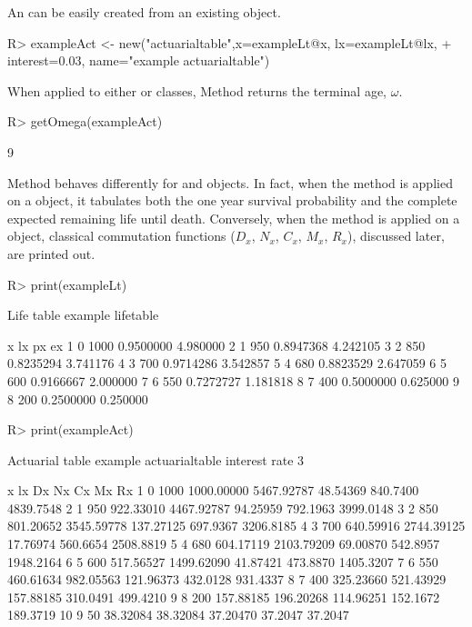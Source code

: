 \documentclass[nojss]{jss}
\begin{document}
An  can be easily created from an existing  object.

\begin{Schunk}
\begin{Sinput}
R> exampleAct <- new("actuarialtable",x=exampleLt@x, lx=exampleLt@lx, 
+  interest=0.03, name="example actuarialtable")
\end{Sinput}
\end{Schunk}

When applied to
either  or  classes, Method   returns the terminal age, $\omega$.

\begin{Schunk}
\begin{Sinput}
R> getOmega(exampleAct)
\end{Sinput}
\begin{Soutput}
[1] 9
\end{Soutput}
\end{Schunk}

Method  behaves differently for  and 
 objects. In fact, when the  method is applied on a
 object, it tabulates both the one year survival probability and the complete
expected remaining life until death. Conversely, when the  method is
applied on a  object, classical commutation
functions ($D_x$, $N_x$, $C_x$, $M_x$, $R_x$), discussed later, are printed out.

\begin{Schunk}
\begin{Sinput}
R> print(exampleLt)
\end{Sinput}
\begin{Soutput}
Life table example lifetable 

  x   lx        px       ex
1 0 1000 0.9500000 4.980000
2 1  950 0.8947368 4.242105
3 2  850 0.8235294 3.741176
4 3  700 0.9714286 3.542857
5 4  680 0.8823529 2.647059
6 5  600 0.9166667 2.000000
7 6  550 0.7272727 1.181818
8 7  400 0.5000000 0.625000
9 8  200 0.2500000 0.250000
\end{Soutput}
\begin{Sinput}
R> print(exampleAct)
\end{Sinput}
\begin{Soutput}
Actuarial table  example actuarialtable interest rate  3 %

   x   lx         Dx         Nx        Cx       Mx        Rx
1  0 1000 1000.00000 5467.92787  48.54369 840.7400 4839.7548
2  1  950  922.33010 4467.92787  94.25959 792.1963 3999.0148
3  2  850  801.20652 3545.59778 137.27125 697.9367 3206.8185
4  3  700  640.59916 2744.39125  17.76974 560.6654 2508.8819
5  4  680  604.17119 2103.79209  69.00870 542.8957 1948.2164
6  5  600  517.56527 1499.62090  41.87421 473.8870 1405.3207
7  6  550  460.61634  982.05563 121.96373 432.0128  931.4337
8  7  400  325.23660  521.43929 157.88185 310.0491  499.4210
9  8  200  157.88185  196.20268 114.96251 152.1672  189.3719
10 9   50   38.32084   38.32084  37.20470  37.2047   37.2047
\end{Soutput}
\end{Schunk}
\end{document}
